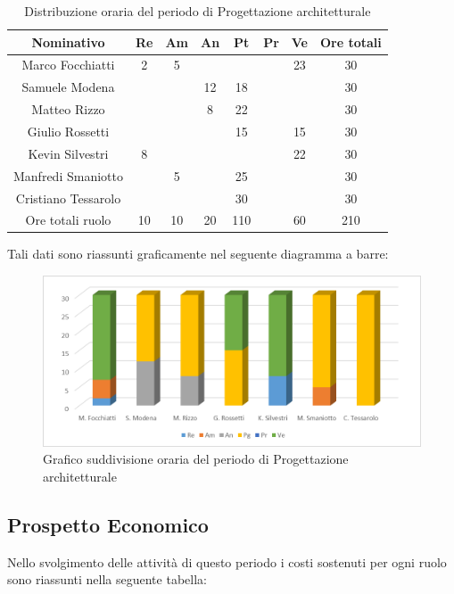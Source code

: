 \documentclass[./PianodiProgetto.tex]{subfiles}
\begin{document}
\begin{table}[H]
	\centering
	\begin{tabular}{|c|cccccc|c|}
		\hline
		Nominativo&Re&Am&An&Pt&Pr&Ve&Ore totali\\ \hline
		Marco Focchiatti&2&5& & & &23&30 \\ \hline
		Samuele Modena& & &12&18& & &30 \\ \hline
		Matteo Rizzo& & &8&22& & &30 \\ \hline
		Giulio Rossetti& & & &15& &15&30 \\ \hline
		Kevin Silvestri&8& & & & &22&30 \\ \hline
		Manfredi Smaniotto& &5& &25& & &30 \\ \hline
		Cristiano Tessarolo& & & &30& & &30 \\  \hline
		Ore totali ruolo&10&10&20&110& &60&210 \\ \hline
	\end{tabular}
	\caption{Distribuzione oraria del periodo di Progettazione architetturale}
\end{table}

Tali dati sono riassunti graficamente nel seguente diagramma a barre:
\begin{figure}[H]
	\centering
	\includegraphics[width=1\linewidth]{img/grafici/ProgettazioneArchitetturaleProspettoOrario}
	\caption{Grafico suddivisione oraria del periodo di Progettazione architetturale}
	\label{fig:progettazione-architetturale-prospetto-orario}
\end{figure}

\subsection{Prospetto Economico}
Nello svolgimento delle attività di questo periodo i costi sostenuti per ogni ruolo sono riassunti nella seguente tabella:
\end{document}
